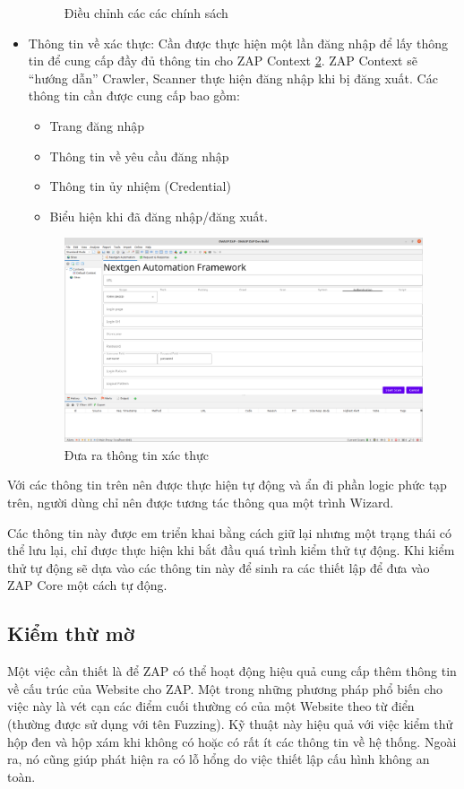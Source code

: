 \documentclass[./../main.tex]{subfiles}
\begin{document}
\begin{itemize}
\begin{figure}[ht!]
		      \caption{ Điều chỉnh các các chính sách }
		      \label{fig:policy}
	      \end{figure}
	\item Thông tin về xác thực: Cần được thực hiện một lần đăng nhập
	      để lấy thông tin để cung cấp đầy đủ thông tin cho ZAP Context \ref{fig:authen}.
	      ZAP Context sẽ “hướng dẫn” Crawler, Scanner thực hiện đăng nhập khi
	      bị đăng xuất. Các thông tin cần được cung cấp bao gồm:
	      \begin{itemize}
		      \item Trang đăng nhập
		      \item Thông tin về yêu cầu đăng nhập
		      \item Thông tin ủy nhiệm (Credential)
		      \item Biểu hiện khi đã đăng nhập/đăng xuất.
	      \end{itemize}
	      \begin{figure}[ht!]
		      \includegraphics[width=\linewidth]{./images/authen.png}
		      \caption{ Đưa ra thông tin xác thực }
		      \label{fig:authen}
	      \end{figure}

\end{itemize}
Với các thông tin trên nên được thực hiện tự động và ẩn đi phần logic
phức tạp trên, người dùng chỉ nên được tương tác thông qua một trình
Wizard.

Các thông tin này được em triển khai bằng cách giữ lại nhưng một
trạng thái có thể lưu lại, chỉ được thực hiện khi bắt đầu quá trình
kiểm thử tự động. Khi kiểm thử tự động sẽ dựa vào các thông tin này
để sinh ra các thiết lập để đưa vào ZAP Core một cách tự động.

\subsection{Kiểm thừ mờ}
Một việc cần thiết là để ZAP có thể hoạt động hiệu quả cung cấp thêm
thông tin về cấu trúc của Website cho ZAP. Một trong những phương pháp
phổ biến cho việc này là vét cạn các điểm cuối thường có của một Website
theo từ điển (thường được sử dụng với tên Fuzzing). Kỹ thuật này hiệu
quả với việc kiểm thử hộp đen và hộp xám khi không có hoặc có rất ít
các thông tin về hệ thống. Ngoài ra, nó cũng giúp phát hiện ra có lỗ
hổng do việc thiết lập cấu hình không an toàn.
\end{document}
